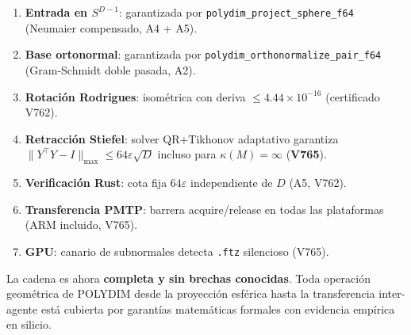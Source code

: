 \begin{enumerate}
  \item \textbf{Entrada en $S^{D-1}$}: garantizada por \texttt{polydim\_project\_sphere\_f64}
        (Neumaier compensado, A4 + A5).
  \item \textbf{Base ortonormal}: garantizada por \texttt{polydim\_orthonormalize\_pair\_f64}
        (Gram-Schmidt doble pasada, A2).
  \item \textbf{Rotación Rodrigues}: isométrica con deriva $\le 4.44\times10^{-16}$ (certificado V762).
  \item \textbf{Retracción Stiefel}: solver QR+Tikhonov adaptativo garantiza
        $\|Y^\top Y - I\|_{\max} \le 64\varepsilon\sqrt{D}$ incluso para $\kappa(M) = \infty$ (\textbf{V765}).
  \item \textbf{Verificación Rust}: cota fija $64\varepsilon$ independiente de $D$ (A5, V762).
  \item \textbf{Transferencia PMTP}: barrera acquire/release en todas las plataformas (ARM incluido, V765).
  \item \textbf{GPU}: canario de subnormales detecta \texttt{.ftz} silencioso (V765).
\end{enumerate}

\noindent La cadena es ahora \textbf{completa y sin brechas conocidas}.
Toda operación geométrica de POLYDIM desde la proyección esférica hasta la transferencia
inter-agente está cubierta por garantías matemáticas formales con evidencia empírica en silicio.
